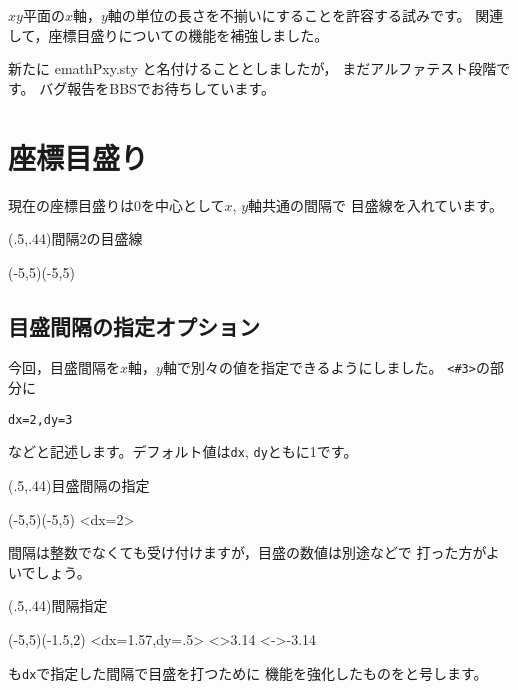 \documentclass[a4j]{jarticle}
\begin{document}
$xy$平面の$x$軸，$y$軸の単位の長さを不揃いにすることを許容する試みです。
関連して，座標目盛りについての機能を補強しました。

新たに \textsf{emathPxy.sty} と名付けることとしましたが，
まだアルファテスト段階です。
バグ報告をBBSでお待ちしています。

\tableofcontents
\clearpage

\section{座標目盛り}
現在の座標目盛りは0を中心として$x$, $y$軸共通の間隔で
目盛線を入れています。

\begin{showEx}(.5,.44){間隔2の目盛線}
\small
\begin{zahyou}[ul=4mm](-5,5)(-5,5)
\end{zahyou}
\end{showEx}

\subsection{目盛間隔の指定オプション}
今回，目盛間隔を$x$軸，$y$軸で別々の値を指定できるようにしました。
\verb/<#3>/の部分に
\begin{jquote}
\begin{verbatim}
dx=2,dy=3
\end{verbatim}
\end{jquote}
などと記述します。デフォルト値は\verb/dx/, \verb/dy/ともに1です。

\begin{showEx}(.5,.44){目盛間隔の指定}
\small
\begin{zahyou}[ul=4mm](-5,5)(-5,5)
\zahyouMemori[g]<dx=2>
\end{zahyou}
\end{showEx}

間隔は整数でなくても受け付けますが，目盛の数値は別途などで
打った方がよいでしょう。

\begin{showEx}(.5,.44){間隔指定}
\footnotesize
\begin{zahyou}[ul=5mm](-5,5)(-1.5,2)
\zahyouMemori[g][n]<dx=1.57,dy=.5>
\xmemori<\pi>{3.14}
\xmemori<-\pi>{-3.14}
\end{zahyou}
\end{showEx}

も\texttt{dx}で指定した間隔で目盛を打つために
機能を強化したものをと号します。
\end{document}

